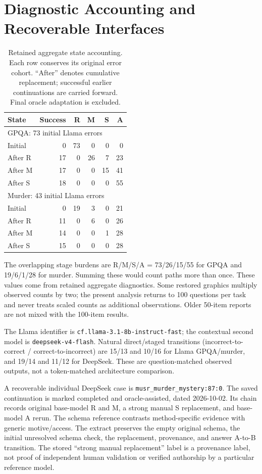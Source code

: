 \section{Diagnostic Accounting and Recoverable Interfaces}
\label{app:states}
\begin{table}[t]
\centering\small
\begin{tabular}{@{}lrrrrr@{}}
\toprule
State & Success & R & M & S & A \\
\midrule
\multicolumn{6}{l}{GPQA: 73 initial Llama errors} \\
Initial & 0 & 73 & 0 & 0 & 0 \\
After R & 17 & 0 & 26 & 7 & 23 \\
After M & 17 & 0 & 0 & 15 & 41 \\
After S & 18 & 0 & 0 & 0 & 55 \\
\midrule
\multicolumn{6}{l}{Murder: 43 initial Llama errors} \\
Initial & 0 & 19 & 3 & 0 & 21 \\
After R & 11 & 0 & 6 & 0 & 26 \\
After M & 14 & 0 & 0 & 1 & 28 \\
After S & 15 & 0 & 0 & 0 & 28 \\
\bottomrule
\end{tabular}
\caption{Retained aggregate state accounting. Each row conserves its original error cohort. ``After'' denotes cumulative replacement; successful earlier continuations are carried forward. Final oracle adaptation is excluded.}
\label{tab:states}
\end{table}

The overlapping stage burdens are R/M/S/A = 73/26/15/55 for GPQA and 19/6/1/28 for murder. Summing these would count paths more than once. These values come from retained aggregate diagnostics. Some restored graphics multiply observed counts by two; the present analysis returns to 100 questions per task and never treats scaled counts as additional observations. Older 50-item reports are not mixed with the 100-item results.

The Llama identifier is \texttt{cf.llama-3.1-8b-instruct-fast}; the contextual second model is \texttt{deepseek-v4-flash}. Natural direct/staged transitions (incorrect-to-correct / correct-to-incorrect) are 15/13 and 10/16 for Llama GPQA/murder, and 19/14 and 11/12 for DeepSeek. These are question-matched observed outputs, not a token-matched architecture comparison.

A recoverable individual DeepSeek case is \texttt{musr\_murder\_mystery:87:0}. The saved continuation is marked completed and oracle-assisted, dated 2026-10-02. Its chain records original base-model R and M, a strong manual S replacement, and base-model A rerun. The schema reference contrasts method-specific evidence with generic motive/access. The extract preserves the empty original schema, the initial unresolved schema check, the replacement, provenance, and answer A-to-B transition. The stored ``strong manual replacement'' label is a provenance label, not proof of independent human validation or verified authorship by a particular reference model.

